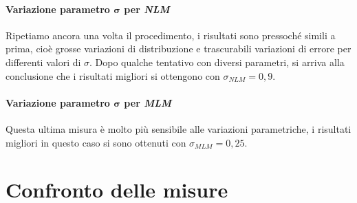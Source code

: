 \documentclass[12pt]{report}
\begin{document}
			\paragraph{Variazione parametro $\bm{\sigma}$ per \textit{NLM}}
			\label{par:sigmaNLM}
			
				Ripetiamo ancora una volta il procedimento, i risultati sono pressoché simili a prima, cioè grosse variazioni di distribuzione e trascurabili variazioni di errore per differenti valori di $\sigma$. Dopo qualche tentativo con diversi parametri, si arriva alla conclusione che i risultati migliori si ottengono con $\sigma_{NLM}=0,9$.
				
			\paragraph{Variazione parametro $\bm{\sigma}$ per \textit{MLM}}	 	 	
		 	 \label{par:sigmaMLM}
		 	 
		 	 	Questa ultima misura è molto più sensibile alle variazioni parametriche, i risultati migliori in questo caso si sono ottenuti con $\sigma_{MLM}=0,25$.
		 	 	
		\section{Confronto delle misure}
		\label{sec:confronto}		 	 	  
		
\end{document}
